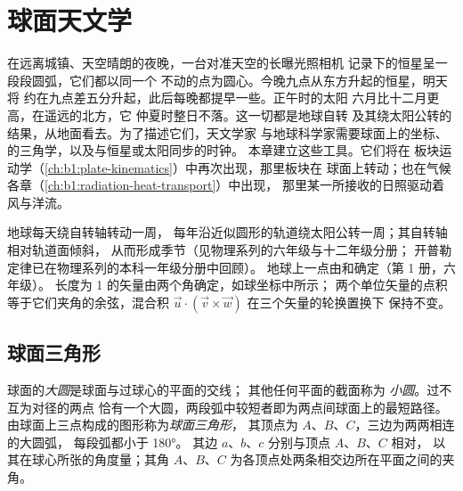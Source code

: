 \chapter{球面天文学}\label{ch:b1:spherical-astronomy}

在远离城镇、天空晴朗的夜晚，一台对准天空的长曝光照相机
记录下的恒星呈一段段圆弧，它们都以同一个
不动的点为圆心。今晚九点从东方升起的恒星，明天将
约在九点差五分升起，此后每晚都提早一些。正午时的太阳
六月比十二月更高，在遥远的北方，它
仲夏时整日不落。这一切都是地球自转
及其绕太阳公转的结果，从地面看去。为了描述它们，天文学家
与地球科学家需要球面上的坐标、
的三角学，以及与恒星或太阳同步的时钟。
本章建立这些工具。它们将在
板块运动学（\cref{ch:b1:plate-kinematics}）中再次出现，那里板块在
球面上转动；也在气候各章（\cref{ch:b1:radiation-heat-transport}）中出现，
那里某一所接收的日照驱动着风与洋流。

\begin{recall}
地球每天绕自转轴转动一周，
每年沿近似圆形的轨道绕太阳公转一周；其自转轴相对轨道面倾斜，
从而形成季节（见物理系列的六年级与十二年级分册；
开普勒定律已在物理系列的本科一年级分册中回顾）。
地球上一点由和确定（第 1 册，六年级）。
长度为 1 的矢量由两个角确定，如球坐标中所示；
两个单位矢量的点积等于它们夹角的余弦，混合积
$\vec u\cdot(\vec v\times\vec w)$ 在三个矢量的轮换置换下
保持不变。
\end{recall}

\section{球面三角形}

\begin{definition}[大圆、球面三角形]\label{def:b1:spherical-astronomy:spherical-triangle}
球面的\emph{大圆}是球面与过球心的平面的交线；
其他任何平面的截面称为
\emph{小圆}。过不互为对径的两点
恰有一个大圆，两段弧中较短者即为两点间球面上的最短路径。
由球面上三点构成的图形称为\emph{球面三角形}，
其顶点为 $A$、$B$、$C$，三边为两两相连的大圆弧，
每段弧都小于 \ang{180}。
其边 $a$、$b$、$c$ 分别与顶点 $A$、$B$、$C$ 相对，
以其在球心所张的角度量；其角 $A$、$B$、$C$
为各顶点处两条相交边所在平面之间的夹角。
\end{definition}

